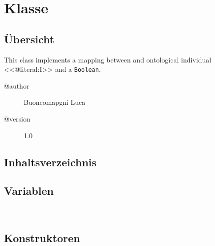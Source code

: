 
\section[FloatDataMapper]{Klasse }\label{ontologyFramework.OFDataMapping.primitiveDataMapper.FloatDataMapper-class}
\subsection{Übersicht}
This class implements a mapping between and 
 ontological individual <<@literal:I>> and a \texttt{Boolean}.
\begin{description}
\item[@author] 
Buoncomapgni Luca
\item[@version] 
1.0
\end{description}
\subsection{Inhaltsverzeichnis}
\subsection{Variablen}
\begin{description}
\item[{\label{ontologyFramework.OFDataMapping.primitiveDataMapper.FloatDataMapper.DoubleMAPPING_dataProperty}}]
~ 
\end{description}
\subsection{Konstruktoren}
\begin{description}
\item[{\label{ontologyFramework.OFDataMapping.primitiveDataMapper.FloatDataMapper()}}]
~ 
\end{description}
